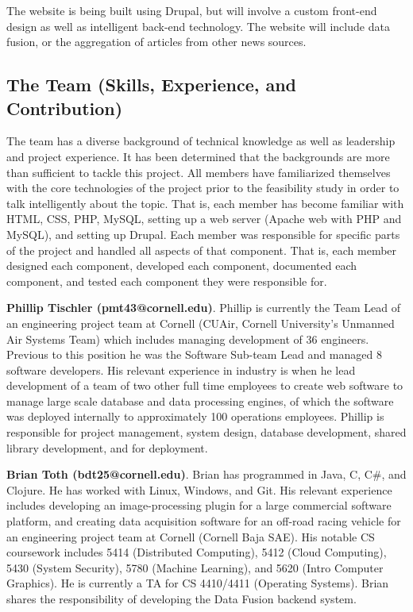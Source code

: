 \documentclass[10pt]{article} %
\begin{document}
The website is being built using Drupal, but will involve a custom front-end design as well as intelligent back-end technology. The website will include data fusion, or the aggregation of articles from other news sources.

\subsection{The Team (Skills, Experience, and Contribution)}

The team has a diverse background of technical knowledge as well as leadership and project experience. It has been determined that the backgrounds are more than sufficient to tackle this project. All members have familiarized themselves with the core technologies of the project prior to the feasibility study in order to talk intelligently about the topic. That is, each member has become familiar with HTML, CSS, PHP, MySQL, setting up a web server (Apache web with PHP and MySQL), and setting up Drupal. Each member was responsible for specific parts of the project and handled all aspects of that component. That is, each member designed each component, developed each component, documented each component, and tested each component they were responsible for.

\textbf{Phillip Tischler (pmt43@cornell.edu)}. Phillip is currently the Team Lead of an engineering project team at Cornell (CUAir, Cornell University’s Unmanned Air Systems Team) which includes managing development of 36 engineers. Previous to this position he was the Software Sub-team Lead and managed 8 software developers. His relevant experience in industry is when he lead development of a team of two other full time employees to create web software to manage large scale database and data processing engines, of which the software was deployed internally to approximately 100 operations employees. Phillip is responsible for project management, system design, database development, shared library development, and for deployment.

\textbf{Brian Toth (bdt25@cornell.edu)}. Brian has programmed in Java, C, C\#, and Clojure. He has worked with Linux, Windows, and Git. His relevant experience includes developing an image-processing plugin for a large commercial software platform, and creating data acquisition software for an off-road racing vehicle for an engineering project team at Cornell (Cornell Baja SAE). His notable CS coursework includes 5414 (Distributed Computing), 5412 (Cloud Computing), 5430 (System Security), 5780 (Machine Learning), and 5620 (Intro Computer Graphics). He is currently a TA for CS 4410/4411 (Operating Systems). Brian shares the responsibility of developing the Data Fusion backend system. 
\end{document}
